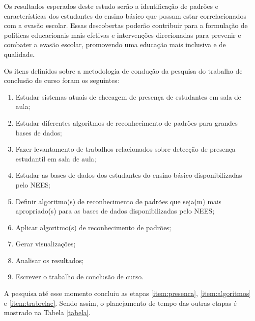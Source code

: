 Os resultados esperados deste estudo serão a identificação de padrões e características dos estudantes do ensino básico que possam estar correlacionados com a evasão escolar. Essas descobertas poderão contribuir para a formulação de políticas educacionais mais efetivas e intervenções direcionadas para prevenir e combater a evasão escolar, promovendo uma educação mais inclusiva e de qualidade.

Os itens definidos sobre a metodologia de condução da pesquisa do trabalho de conclusão de curso foram os seguintes:

\begin{enumerate}
	\item \label{item:presenca} Estudar sistemas atuais de checagem de presença de estudantes em sala de aula;
    \item \label{item:algoritmos} Estudar diferentes algoritmos de reconhecimento de padrões para grandes bases de dados;
    \item \label{item:trabrelac} Fazer levantamento de trabalhos relacionados sobre detecção de presença estudantil em sala de aula;
    \item \label{item:base} Estudar as bases de dados dos estudantes do ensino básico disponibilizadas pelo NEES;
    \item \label{item:definir} Definir algoritmo(s) de reconhecimento de padrões que seja(m) mais apropriado(s) para as bases de dados disponibilizadas pelo NEES;
    \item \label{item:algoritmo} Aplicar algoritmo(s) de reconhecimento de padrões;
    \item \label{item:graficos} Gerar visualizações;
    \item \label{item:analise} Analisar os resultados;
	\item \label{item:escrita} Escrever o trabalho de conclusão de curso.
	\end{enumerate}

  A pesquisa até esse momento concluiu as etapas \ref{item:presenca}, \ref{item:algoritmos} e \ref{item:trabrelac}. Sendo assim, o planejamento de tempo das outras etapas é mostrado na Tabela \ref{tabela}.

